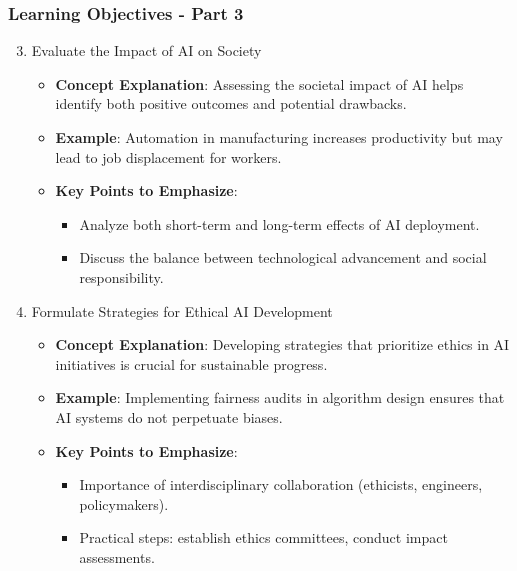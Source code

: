 \documentclass[aspectratio=169]{beamer}
\begin{document}
\begin{frame}[fragile]
    \frametitle{Learning Objectives - Part 3}
    \begin{enumerate}
        \setcounter{enumi}{2} %
        \item Evaluate the Impact of AI on Society
            \begin{itemize}
                \item \textbf{Concept Explanation}: Assessing the societal impact of AI helps identify both positive outcomes and potential drawbacks.
                \item \textbf{Example}: Automation in manufacturing increases productivity but may lead to job displacement for workers.
                \item \textbf{Key Points to Emphasize}:
                    \begin{itemize}
                        \item Analyze both short-term and long-term effects of AI deployment.
                        \item Discuss the balance between technological advancement and social responsibility.
                    \end{itemize}
            \end{itemize}
            
        \item Formulate Strategies for Ethical AI Development
            \begin{itemize}
                \item \textbf{Concept Explanation}: Developing strategies that prioritize ethics in AI initiatives is crucial for sustainable progress.
                \item \textbf{Example}: Implementing fairness audits in algorithm design ensures that AI systems do not perpetuate biases.
                \item \textbf{Key Points to Emphasize}: 
                    \begin{itemize}
                        \item Importance of interdisciplinary collaboration (ethicists, engineers, policymakers).
                        \item Practical steps: establish ethics committees, conduct impact assessments.
                    \end{itemize}
            \end{itemize}
    \end{enumerate}
\end{frame}
\end{document}
